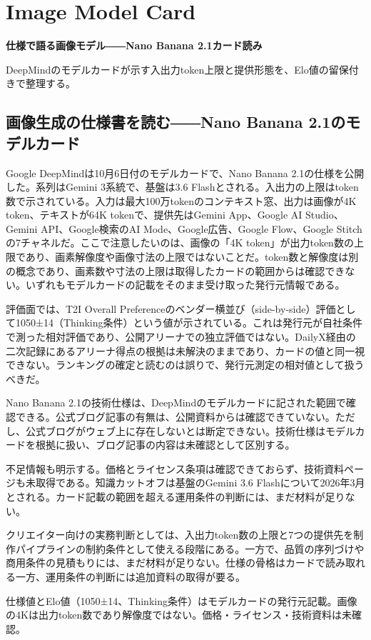\section{Image Model Card}
\begin{wideflow}
{\Large\bfseries 仕様で語る画像モデル――Nano Banana 2.1カード読み\par}
\smallskip
{\color{SurveyMuted}DeepMindのモデルカードが示す入出力token上限と提供形態を、Elo値の留保付きで整理する。\par}
\end{wideflow}

\subsection*{画像生成の仕様書を読む――Nano Banana 2.1のモデルカード}

Google DeepMindは10月6日付のモデルカードで、Nano Banana 2.1の仕様を公開した。系列はGemini 3系統で、基盤は3.6 Flashとされる。入出力の上限はtoken数で示されている。入力は最大100万tokenのコンテキスト窓、出力は画像が4K token、テキストが64K tokenで、提供先はGemini App、Google AI Studio、Gemini API、Google検索のAI Mode、Google広告、Google Flow、Google Stitchの7チャネルだ。ここで注意したいのは、画像の「4K token」が出力token数の上限であり、画素解像度や画像寸法の上限ではないことだ。token数と解像度は別の概念であり、画素数や寸法の上限は取得したカードの範囲からは確認できない。いずれもモデルカードの記載をそのまま受け取った発行元情報である。\cite{nanobanana}

評価面では、T2I Overall Preferenceのベンダー横並び（side-by-side）評価として1050±14（Thinking条件）という値が示されている。これは発行元が自社条件で測った相対評価であり、公開アリーナでの独立評価ではない。DailyX経由の二次記録にあるアリーナ得点の根拠は未解決のままであり、カードの値と同一視できない。ランキングの確定と読むのは誤りで、発行元測定の相対値として扱うべきだ。\cite{nanobanana}

Nano Banana 2.1の技術仕様は、DeepMindのモデルカードに記された範囲で確認できる。公式ブログ記事の有無は、公開資料からは確認できていない。ただし、公式ブログがウェブ上に存在しないとは断定できない。技術仕様はモデルカードを根拠に扱い、ブログ記事の内容は未確認として区別する。\cite{nanobanana}

不足情報も明示する。価格とライセンス条項は確認できておらず、技術資料ページも未取得である。知識カットオフは基盤のGemini 3.6 Flashについて2026年3月とされる。カード記載の範囲を超える運用条件の判断には、まだ材料が足りない。\cite{nanobanana}

クリエイター向けの実務判断としては、入出力token数の上限と7つの提供先を制作パイプラインの制約条件として使える段階にある。一方で、品質の序列づけや商用条件の見積もりには、まだ材料が足りない。仕様の骨格はカードで読み取れる一方、運用条件の判断には追加資料の取得が要る。\cite{nanobanana}

\begin{technicalnote}[Note]
仕様値とElo値（1050±14、Thinking条件）はモデルカードの発行元記載。画像の4Kは出力token数であり解像度ではない。価格・ライセンス・技術資料は未確認。
\end{technicalnote}
